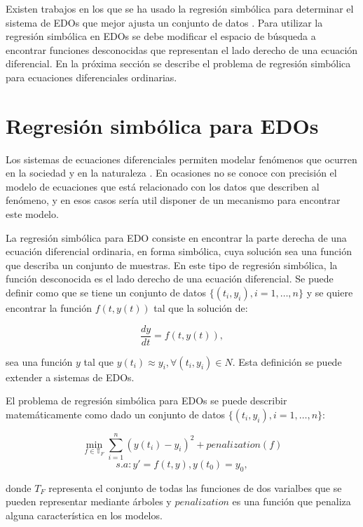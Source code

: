 Existen trabajos en los que se ha usado la regresión simbólica para determinar el sistema de EDOs que mejor ajusta un conjunto de datos \cite{koza1994genetic, iba2008inference, gaucel2014learning, kronberger2019identification}. Para utilizar la regresión simbólica en EDOs se debe modificar el espacio de búsqueda a encontrar funciones desconocidas que representan el lado derecho de una ecuación diferencial. En la próxima sección se describe el problema de regresión simbólica para ecuaciones diferenciales ordinarias.

\section{Regresión simbólica para EDOs}\label{section:symbolic_regression_in_does}

Los sistemas de ecuaciones diferenciales permiten modelar fenómenos que ocurren en la sociedad y en la naturaleza \cite{weiss2013sir, udrescu2020ai, kuddus2021mathematical}. En ocasiones no se conoce con precisión el modelo de ecuaciones que está relacionado con los datos que describen al fenómeno, y en esos casos sería util disponer de un mecanismo para encontrar este modelo.

La regresión simbólica para EDO consiste en encontrar la parte derecha de una ecuación diferencial ordinaria, en forma simbólica, cuya solución sea una función que describa un conjunto de muestras. En este tipo de regresión simbólica, la función desconocida es el lado derecho de una ecuación diferencial. Se puede definir como que se tiene un conjunto de datos $\{(t_i, y_i), i = 1, \dots, n\}$ y se quiere encontrar la función $f(t, y(t))$ tal que la solución de:

\begin{equation*}
    \frac{dy}{dt} = f(t, y(t)),
\end{equation*}

sea una función $y$ tal que $y(t_i) \approx y_i, \forall(t_i, y_i) \in N$. Esta definición se puede extender a sistemas de EDOs.

El problema de regresión simbólica para EDOs se puede describir matemáticamente como dado un conjunto de datos $\{(t_i, y_i), i = 1, \dots, n\}$:

$$\min_{f\in\mathbb{T}_F} \sum_{i=1}^n (y(t_i) - y_i)^2 + penalization(f)$$
$$s.a: y' = f(t, y), y(t_0) = y_0,$$

donde $T_F$ representa el conjunto de todas las funciones de dos varialbes que se pueden representar mediante árboles y $penalization$ es una función que penaliza alguna característica en los modelos.

